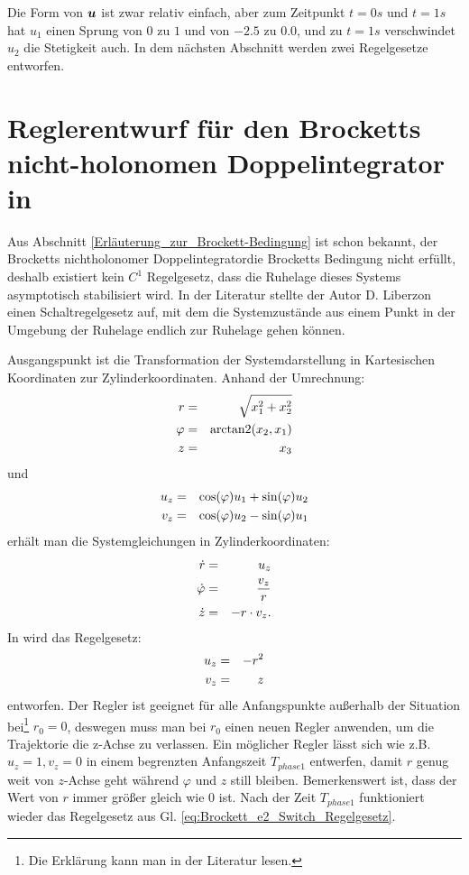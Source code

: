 Die Form von $\boldsymbol u$ ist zwar relativ einfach, aber zum Zeitpunkt $t=0s$ und $t=1s$ hat $u_{1}$ einen Sprung von $0$ zu $1$ und von $-2.5$ zu $0.0$, und zu $t=1s$ verschwindet $u_{2}$ die Stetigkeit auch. In dem nächsten Abschnitt werden zwei Regelgesetze entworfen.

\section{Reglerentwurf für den Brocketts nicht-holonomen Doppelintegrator in \cite{liberzon2012switching}}
\label{Reglerentwurf_für_den_Brocketts_nichtholonomischen_Doppelintegrator_in_Literatur_liberzon2012switching}
Aus Abschnitt \ref{Erläuterung_zur_Brockett-Bedingung} ist schon bekannt, der Brocketts nichtholonomer Doppelintegratordie Brocketts Bedingung nicht erfüllt, deshalb existiert kein $C^{1}$ Regelgesetz, dass die Ruhelage dieses Systems asymptotisch stabilisiert wird. In der Literatur \cite{liberzon2012switching} stellte der Autor D. Liberzon einen Schaltregelgesetz auf, mit dem die Systemzustände aus einem Punkt in der Umgebung der Ruhelage endlich zur Ruhelage gehen können.

Ausgangspunkt ist die Transformation der Systemdarstellung in Kartesischen Koordinaten zur Zylinderkoordinaten. Anhand der Umrechnung:
\begin{eqnarray}
r &=& \sqrt{x_{1}^{2}+x_{2}^{2}}\notag\\
\varphi &=& \mathrm{arctan2}(x_{2},x_{1})\notag\\
z &=& x_{3}
\label{eq:Darsgellung_von_Kar_und_Zylinder}
\end{eqnarray}
und 
\begin{eqnarray}
u_{z} &=& \cos(\varphi)u_{1} + \sin(\varphi)u_{2}\notag\\
v_{z} &=& \cos(\varphi)u_{2} - \sin(\varphi)u_{1}
\end{eqnarray} 
erhält man die Systemgleichungen in Zylinderkoordinaten:
\begin{eqnarray}
	\dot{r} &=& u_{z}\notag\\
	\dot{\varphi} &=& \frac{v_{z}}{r}\notag\\
	\dot{z} &=& -r\cdot v_{z}.
	\label{eq:Brockett_e2_in_Zylinderkoordinaten}
\end{eqnarray}  
In \cite{liberzon2012switching} wird das Regelgesetz: 
\begin{eqnarray}
	u_{z} &=& -r^2\notag\\
	v_{z} &=& z
	\label{eq:Brockett_e2_Switch_Regelgesetz}
\end{eqnarray}
entworfen. Der Regler ist geeignet für alle Anfangspunkte außerhalb der Situation bei\footnote{Die Erklärung kann man in der Literatur \cite{liberzon2012switching} lesen.} $r_{0}=0$, deswegen muss man bei $r_{0}$ einen neuen Regler anwenden, um die Trajektorie die z-Achse zu verlassen. Ein möglicher Regler lässt sich wie z.B. $u_{z}=1, v_{z}=0$ in einem begrenzten Anfangszeit $T_{phase1}$ entwerfen, damit $r$ genug weit von $z$-Achse geht während $\varphi$ und $z$ still bleiben. Bemerkenswert ist, dass der Wert von $r$ immer größer gleich wie $0$ ist. Nach der Zeit $T_{phase1}$ funktioniert wieder das Regelgesetz aus Gl. \eqref{eq:Brockett_e2_Switch_Regelgesetz}.


